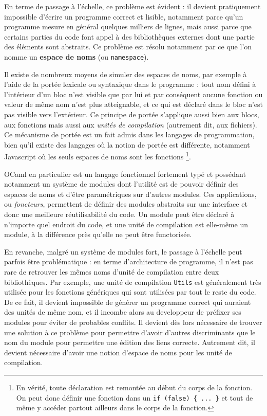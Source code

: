 \documentclass[11pt,a4paper]{report}
\begin{document}
En terme de passage à l'échelle, ce problème est évident : il devient
pratiquement impossible d'écrire un programme correct et lisible, notamment
parce qu'un programme mesure en général quelques milliers de lignes, mais aussi
parce que certains parties du code font appel à des bibliothèques externes dont
une partie des éléments sont abstraits. Ce problème est résolu notamment par ce
que l'on nomme un \textbf{espace de noms} (ou \texttt{namespace}).

Il existe de nombreux moyens de simuler des espaces de noms, par exemple à
l'aide de la portée lexicale ou syntaxique dans le programme : tout nom défini à
l'intérieur d'un bloc n'est visible que par lui et par conséquent aucune
fonction ou valeur de même nom n'est plus atteignable, et ce qui est déclaré
dans le bloc n'est pas visible vers l'extérieur. Ce principe de portée
s'applique aussi bien aux blocs, aux fonctions mais aussi aux \emph{unités de
  compilation} (autrement dit, aux fichiers). Ce mécanisme de portée est un fait
admis dans les langages de programmation, bien qu'il existe des langages où la
notion de portée est différente, notamment Javascript où les seuls espaces de
noms sont les fonctions \cite{EcmaScript}\footnote{En vérité, toute déclaration
  est remontée au début du corps de la fonction. On peut donc définir une
  fonction dans un \texttt{if (false) \{ ... \}} et tout de même y accéder
  partout ailleurs dans le corps de la fonction.}.

OCaml en particulier est un langage fonctionnel fortement typé et possédant
notamment un système de modules dont l'utilité est de pouvoir définir des
espaces de noms et d'être paramétriques sur d'autres modules. Ces applications,
ou \emph{foncteurs}, permettent de définir des modules abstraits sur une
interface et donc une meilleure réutilisabilité du code. Un module peut être
déclaré à n'importe quel endroit du code, et une unité de compilation est
elle-même un module, à la différence près qu'elle ne peut être functorisée.

En revanche, malgré un système de modules fort, le passage à l'échelle peut
parfois être problématique : en terme d'architecture de programme, il n'est pas
rare de retrouver les mêmes noms d'unité de compilation entre deux
bibliothèques. Par exemple, une unité de compilation \texttt{Utils} est
généralement très utilisée pour les fonctions génériques qui sont utilisées par
tout le reste du code. De ce fait, il devient impossible de générer un programme
correct qui auraient des unités de même nom, et il incombe alors au developpeur
de préfixer ses modules pour éviter de probables conflits. Il devient dès lors
nécessaire de trouver une solution à ce problème pour permettre d'avoir d'autres
discriminants que le nom du module pour permettre une édition des liens
correcte. Autrement dit, il devient nécessaire d'avoir une notion d'espace de
noms pour les unité de compilation.
\end{document}
